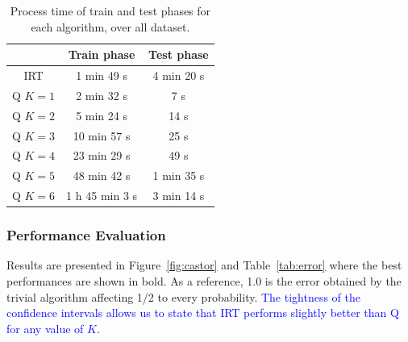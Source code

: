 \documentclass{sig-alternate}
\newcommand\note[1]{\textcolor{blue}{#1}}
\begin{document}
\begin{table}
\small\centering\begin{tabular}{@{}ccc@{}}
& Train phase & Test phase\\
\hline
IRT & 1 min 49 s & 4 min 20 s\\%
Q $K = 1$ & 2 min 32 s & 7 s\\
Q $K = 2$ & 5 min 24 s & 14 s\\
Q $K = 3$ & 10 min 57 s & 25 s\\ %
Q $K = 4$ & 23 min 29 s & 49 s\\ %
Q $K = 5$ & 48 min 42 s & 1 min 35 s\\ %
Q $K = 6$ & 1 h 45 min 3 s & 3 min 14 s %
\end{tabular}
\caption{Process time of train and test phases for each algorithm, over all dataset.}
\label{tab:time}
\end{table}

\subsubsection{Performance Evaluation}

 Results are presented in Figure~\ref{fig:castor} and Table~\ref{tab:error} where the best performances are shown in bold. As a reference, 1.0 is the error obtained by the trivial algorithm affecting 1/2 to every probability. \note{The tightness of the confidence intervals allows us to state that IRT performs slightly better than Q for any value of $K$.} %
\end{document}
